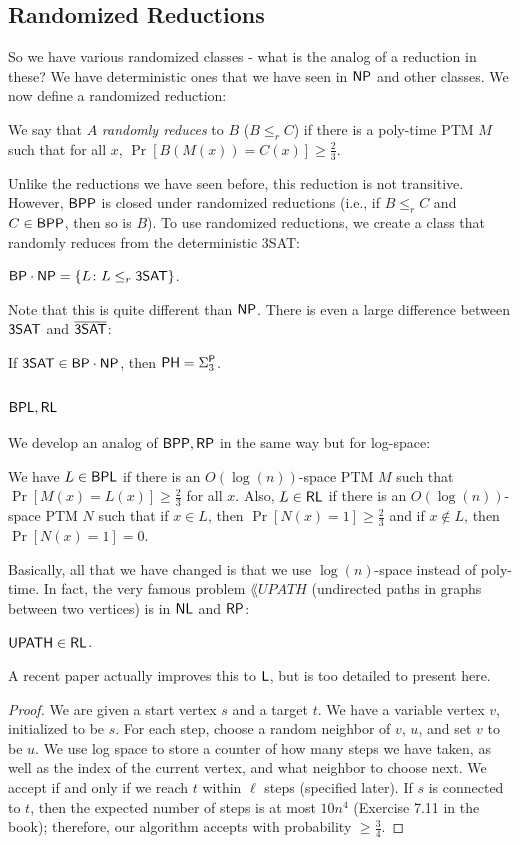 \subsection{Randomized Reductions}
So we have various randomized classes - what is the analog of a reduction in these? We have deterministic ones that we have seen in ${\mathsf{NP}}$ and other classes. We now define a randomized reduction:
\begin{definition}
We say that $A$ \emph{randomly reduces} to $B$ ($B \le_r C$) if there is a poly-time PTM $M$ such that for all $x$, $\Pr[B(M(x)) = C(x)] \ge \frac{2}{3}$. 
\end{definition}
Unlike the reductions we have seen before, this reduction is not transitive. However, ${\mathsf{BPP}}$ is closed under randomized reductions (i.e., if $B \le_r C$ and $C \in {\ensuremath{\mathsf{BPP}}}$, then so is $B$). To use randomized reductions, we create a class that randomly reduces from the deterministic 3SAT:
\begin{definition}
${\mathsf{BP}}\cdot {\ensuremath{\mathsf{NP}}} = \{L \colon L \le_r {\mathsf{3SAT}}\}$. 
\end{definition}
Note that this is quite different than ${\mathsf{NP}}$. There is even a large difference between ${\mathsf{3SAT}}$ and $\overline{{\mathsf{3SAT}}}$:
\begin{theorem}
If ${\mathsf{3SAT}} \in {\ensuremath{\mathsf{BP}}}\cdot {\ensuremath{\mathsf{NP}}}$, then ${\mathsf{PH}} = \Sigma_3^{\mathsf{P}}$. 
\end{theorem}  

\newcommand{\UPATH}{\lang{UPATH}}
\subsection{${\mathsf{BPL}}, {\mathsf{RL}}$}
We develop an analog of ${\mathsf{BPP}}, {\mathsf{RP}}$ in the same way but for log-space:
\begin{definition}
We have $L \in {\ensuremath{\mathsf{BPL}}}$ if there is an $O(\log(n))$-space PTM $M$ such that $\Pr[M(x) = L(x)] \ge \frac{2}{3}$ for all $x$. Also, $L \in {\ensuremath{\mathsf{RL}}}$ if there is an $O(\log(n))$-space PTM $N$ such that if $x \in L$, then $\Pr[N(x) = 1] \ge \frac{2}{3}$ and if $x \notin L$, then $\Pr[N(x) = 1] = 0$. 
\end{definition}
Basically, all that we have changed is that we use $\log(n)$-space instead of poly-time. In fact, the very famous problem $\UPATH$ (undirected paths in graphs between two vertices) is in ${\mathsf{NL}}$ and ${\mathsf{RP}}$:
\begin{theorem}
$\UPATH \in \RL$.
\end{theorem}
A recent paper actually improves this to ${\mathsf{L}}$, but is too detailed to present here.
\begin{proof}
We are given a start vertex $s$ and a target $t$. We have a variable vertex $v$, initialized to be $s$. For each step, choose a random neighbor of $v$, $u$, and set $v$ to be $u$. We use log space to store a counter of how many steps we have taken, as well as the index of the current vertex, and what neighbor to choose next. We accept if and only if we reach $t$ within $\ell$ steps (specified later). If $s$ is connected to $t$, then the expected number of steps is at most $10n^4$ (Exercise 7.11 in the book); therefore, our algorithm accepts with probability $\ge \frac{3}{4}$. 
\end{proof}

